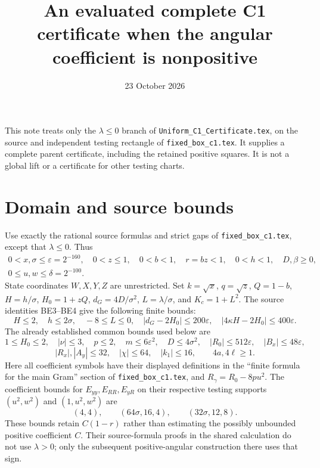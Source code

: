 \documentclass[11pt]{article}
\title{An evaluated complete C1 certificate when the angular coefficient is nonpositive}
\author{}\date{23 October 2026}
\newcommand{\eps}{\varepsilon}
\begin{document}
\maketitle

This note treats only the $\lambda\le0$ branch of
\texttt{Uniform\_C1\_Certificate.tex}, on the source and independent
testing rectangle of \texttt{fixed\_box\_c1.tex}. It supplies a complete
parent certificate, including the retained positive squares. It is not a
global lift or a certificate for other testing charts.

\section{Domain and source bounds}

Use exactly the rational source formulas and strict gaps of
\texttt{fixed\_box\_c1.tex}, except that $\lambda\le0$. Thus
\[
 \begin{gathered}
 0<x,\sigma\le\eps=2^{-160},\quad 0<z\le1,\quad
 0<b<1,\quad r=bz<1,\quad 0<h<1,\quad D,\beta\ge0,
 \\ 0\le u,w\le\delta=2^{-100}.
 \end{gathered}
\]
State coordinates $W,X,Y,Z$ are unrestricted. Set $k=\sqrt x$,
$q=\sqrt z$, $Q=1-b$, $H=h/\sigma$, $H_0=1+zQ$,
$d_G=4D/\sigma^2$, $L=\lambda/\sigma$, and $K_c=1+L^2$.
The source identities BE3--BE4 give the following finite bounds:
\[
 H\le2,\quad h\le2\sigma,\quad -8\le L\le0,\quad
 |d_G-2H_0|\le200\eps,\quad
 |4\kappa H-2H_0|\le400\eps.                 \tag{N1}
\]
The already established common bounds used below are
\[
 1\le H_0\le2,\quad |\nu|\le3,\quad p\le2,\quad
 m\le6\eps^2,\quad D\le4\sigma^2,\quad
 |R_0|\le512\eps,\quad |B_x|\le48\eps,
\]
\[
 |R_x|,|A_y|\le32,\quad |\chi|\le64,\quad
 |k_1|\le16,\qquad 4a,4\ell\ge1.           \tag{N2}
\]
Here all coefficient symbols have their displayed definitions in the
``finite formula for the main Gram'' section of
\texttt{fixed\_box\_c1.tex}, and $R_\gamma=R_0-8pu^2$.
The coefficient bounds for $E_{yy},E_{RR},E_{yR}$ on their respective
testing supports $(u^2,w^2)$ and $(1,u^2,w^2)$ are
\[
 (4,4),\qquad (64\sigma,16,4),\qquad
 (32\sigma,12,8).                         \tag{N3}
\]
These bounds retain $C(1-r)$ rather than estimating the possibly
unbounded positive coefficient $C$. Their source-formula proofs in the
shared calculation do not use $\lambda>0$; only the subsequent
positive-angular construction there uses that sign.
\end{document}
